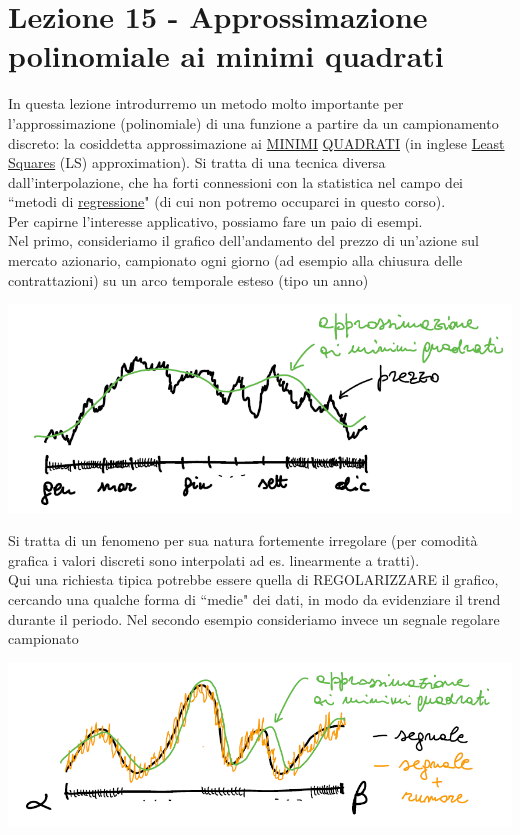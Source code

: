 \documentclass[12pt,a4paper]{article}
\begin{document}
\section{Lezione 15 - Approssimazione polinomiale ai minimi quadrati}
In questa lezione introdurremo un metodo molto importante per l'approssimazione (polinomiale) di una funzione a partire da un campionamento discreto: la cosiddetta approssimazione ai \uline{MINIMI} \uline{QUADRATI} (in inglese \uline{Least Squares} (LS) approximation). Si tratta di una tecnica diversa\\ dall'interpolazione, che ha forti connessioni con la statistica nel
campo dei ``metodi di \uline{regressione}" (di cui non potremo occuparci in questo corso).\\
Per capirne l'interesse applicativo, possiamo fare un paio di esempi.\\
Nel primo, consideriamo il grafico dell'andamento del prezzo di un'azione sul mercato azionario, campionato ogni giorno (ad esempio alla chiusura delle contrattazioni) su un arco temporale esteso (tipo un anno)
\begin{center}
    \includegraphics[scale=0.7]{pag2.png}
\end{center}
Si tratta di un fenomeno per sua natura fortemente irregolare (per comodità grafica i valori discreti sono interpolati ad es. linearmente a tratti).\\
Qui una richiesta tipica potrebbe essere quella di REGOLARIZZARE il grafico, cercando una qualche forma di ``medie" dei dati, in modo da evidenziare il trend durante il periodo.
\newline\newline
Nel secondo esempio consideriamo invece un segnale regolare campionato
\begin{center}
    \includegraphics[scale=0.7]{pag3.png}
\end{center}
\end{document}
